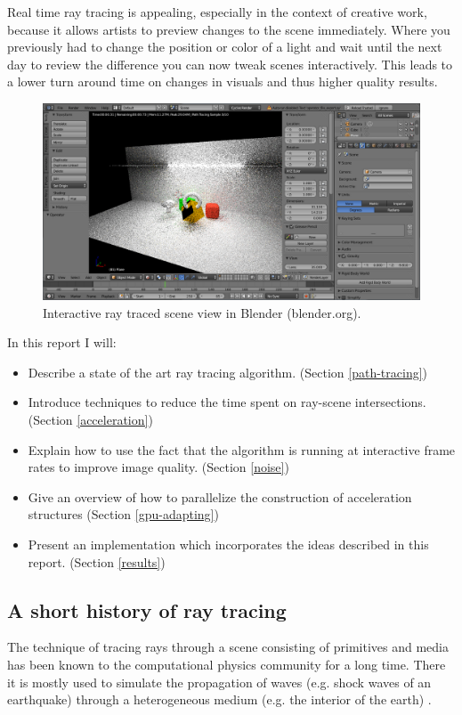 \documentclass{ACGSeminar}
\begin{document}
Real time ray tracing is appealing, especially in the context of creative work, because it allows artists to preview changes to the scene immediately. Where you previously had to change the position or color of a light and wait until the next day to review the difference you can now tweak scenes interactively. This leads to a lower turn around time on changes in visuals and thus higher quality results.

\begin{figure}[htb!]
  \begin{centering}
    \includegraphics[width=12cm,natwidth=1307,natheight=682]{figures/blender_preview.png}\par
  \end{centering}
  \caption{Interactive ray traced scene view in Blender (blender.org).}
  \label{fig:blender_preview}
\end{figure}

In this report I will:
\begin{itemize}
\item Describe a state of the art ray tracing algorithm. (Section \ref{path-tracing})
\item Introduce techniques to reduce the time spent on ray-scene intersections. (Section \ref{acceleration})
\item Explain how to use the fact that the algorithm is running at interactive frame rates to improve image quality. (Section \ref{noise})
\item Give an overview of how to parallelize the construction of acceleration structures (Section \ref{gpu-adapting}) 
\item Present an implementation which incorporates the ideas described in this report. (Section \ref{results})
\end{itemize}


\subsection{A short history of ray tracing}
The technique of tracing rays through a scene consisting of primitives and media has been known to the computational physics community for a long time. There it is mostly used to simulate the propagation of waves (e.g. shock waves of an earthquake) through a heterogeneous medium (e.g. the interior of the earth) \cite{GJI:GJI93}.
\end{document}
